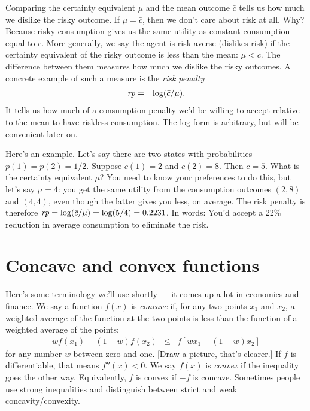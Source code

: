 \documentclass[11pt]{article}
\newcommand{\rp}{\mbox{\it rp\/}}
\newcommand{\cbar}{\bar{c}}
\begin{document}
Comparing the certainty equivalent $\mu$ and the mean outcome $\cbar$
tells us how much we dislike the risky outcome.
If $\mu = \cbar$,
then we don't care about risk at all.
Why?
Because risky consumption gives us the same
utility as constant consumption equal to $\cbar$.
More generally, we say the agent is risk averse (dislikes risk)
if the certainty equivalent of the risky outcome
is less than the mean:   $\mu < \cbar$.
The difference between them measures how much we dislike the risky outcomes.
A concrete example of such a measure is the {\it risk penalty\/}
\begin{eqnarray}
    \rp &=& \log (\cbar/\mu)  .
    \label{eq:rp-def}
\end{eqnarray}
It tells us how much of a consumption penalty we'd be willing to accept
relative to the mean to have riskless consumption.
The log form is arbitrary, but will be convenient later on.

Here's an example.
Let's say there are two states with probabilities
$p(1) = p(2) = 1/2$.
Suppose $c(1) = 2$ and $c(2) = 8$.
Then $\cbar = 5$.
What is the certainty equivalent $\mu$?
You need to know your preferences to do this,
but let's say $\mu = 4$:  you get the same utility
from the consumption outcomes $(2,8)$ and $(4,4)$,
even though the latter gives you less, on average.
The risk penalty is therefore
$ \rp = \log (\cbar/\mu) = \log(5/4) = 0.2231$.
In words: You'd accept a 22\% reduction in average consumption to eliminate the risk.


\section{Concave and convex functions}

Here's some terminology we'll use shortly --- it comes up a lot
in economics and finance.
We say a function $f(x)$ is {\it concave\/}
if, for any two points $x_1$ and $x_2$,
a weighted average of the function at the two points
is less than the function of a weighted average of the points:
\begin{eqnarray}
    w f(x_1) + (1-w) f(x_2) &\leq& f[ w x_1 + (1-w) x_2]
    \label{eq:concave-def}
\end{eqnarray}
for any number $w$ between zero and one.
[Draw a picture, that's clearer.]
If $f$ is differentiable, that means $f''(x) < 0$.
We say $f(x)$ is  {\it convex\/}
if the inequality goes the other way.
Equivalently, $f$ is convex if $-f$ is concave.
Sometimes people use strong inequalities and distinguish
between strict and weak concavity/convexity.
\end{document}
